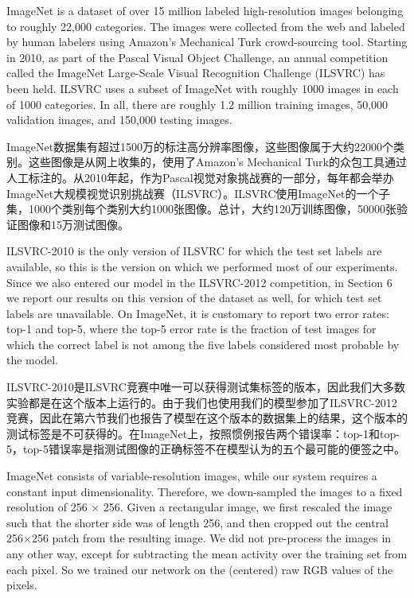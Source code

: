 \documentclass[12pt,a4paper,UTF8,twoside]{book}
\begin{document}
ImageNet is a dataset of over 15 million labeled high-resolution images belonging to roughly 22,000 categories. The images were collected from the web and labeled by human labelers using Amazon's Mechanical Turk crowd-sourcing tool. Starting in 2010, as part of the Pascal Visual Object Challenge, an annual competition called the ImageNet Large-Scale Visual Recognition Challenge (ILSVRC) has been held. ILSVRC uses a subset of ImageNet with roughly 1000 images in each of 1000 categories. In all, there are roughly 1.2 million training images, 50,000 validation images, and 150,000 testing images.

ImageNet数据集有超过1500万的标注高分辨率图像，这些图像属于大约22000个类别。这些图像是从网上收集的，使用了Amazon's Mechanical Turk的众包工具通过人工标注的。从2010年起，作为Pascal视觉对象挑战赛的一部分，每年都会举办ImageNet大规模视觉识别挑战赛（ILSVRC）。ILSVRC使用ImageNet的一个子集，1000个类别每个类别大约1000张图像。总计，大约120万训练图像，50000张验证图像和15万测试图像。

ILSVRC-2010 is the only version of ILSVRC for which the test set labels are available, so this is the version on which we performed most of our experiments. Since we also entered our model in the ILSVRC-2012 competition, in Section 6 we report our results on this version of the dataset as well, for which test set labels are unavailable. On ImageNet, it is customary to report two error rates: top-1 and top-5, where the top-5 error rate is the fraction of test images for which the correct label is not among the five labels considered most probable by the model.

ILSVRC-2010是ILSVRC竞赛中唯一可以获得测试集标签的版本，因此我们大多数实验都是在这个版本上运行的。由于我们也使用我们的模型参加了ILSVRC-2012竞赛，因此在第六节我们也报告了模型在这个版本的数据集上的结果，这个版本的测试标签是不可获得的。在ImageNet上，按照惯例报告两个错误率：top-1和top-5，top-5错误率是指测试图像的正确标签不在模型认为的五个最可能的便签之中。

ImageNet consists of variable-resolution images, while our system requires a constant input dimensionality. Therefore, we down-sampled the images to a fixed resolution of 256 × 256. Given a rectangular image, we first rescaled the image such that the shorter side was of length 256, and then cropped out the central 256×256 patch from the resulting image. We did not pre-process the images in any other way, except for subtracting the mean activity over the training set from each pixel. So we trained our network on the (centered) raw RGB values of the pixels.
\end{document}
